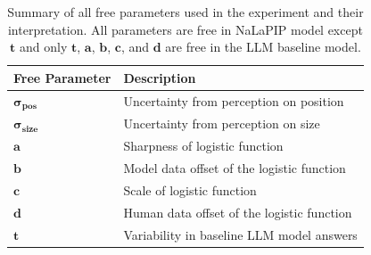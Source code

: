 \documentclass[10pt,letterpaper]{article}
\begin{document}
\begin{table}
\begin{center} 
\begin{tabular}{ll} 
\hline
Free Parameter    &  Description \\
\hline
$\boldsymbol{\sigma_{pos}}$      &   Uncertainty from perception on position \\
$\boldsymbol{\sigma_{size}}$      &   Uncertainty from perception on size \\
$\boldsymbol{a}$           &   Sharpness of logistic function \\
$\boldsymbol{b}$           &   Model data offset of the logistic function \\
$\boldsymbol{c}$           &   Scale of logistic function \\
$\boldsymbol{d}$           &   Human data offset of the logistic function \\
$\boldsymbol{t}$           &   Variability in baseline LLM model answers \\
\hline
\end{tabular} 
\caption{Summary of all free parameters used in the experiment and their interpretation. All parameters are free in NaLaPIP model except $\boldsymbol{t}$ and only $\boldsymbol{t}$, $\boldsymbol{a}$, $\boldsymbol{b}$, $\boldsymbol{c}$, and $\boldsymbol{d}$ are free in the LLM baseline model.} 
\label{table:free-parameters} 
\end{center} 
\end{table}
\end{document}
